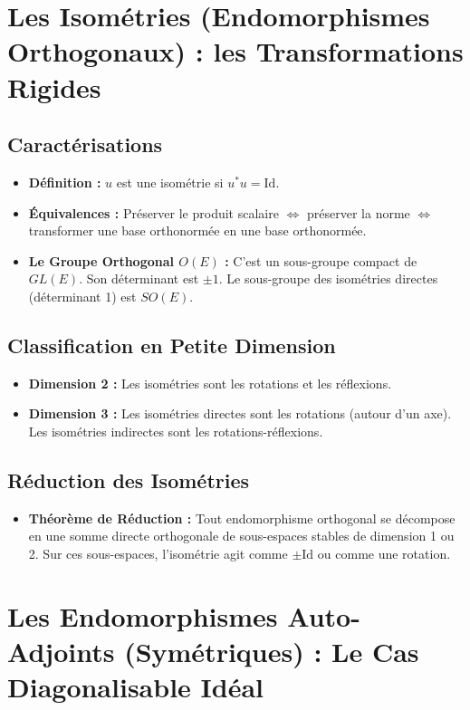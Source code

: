 \documentclass[12pt, a4paper, parskip=full]{report}
\theoremstyle{agregstyle}
\begin{document}
\section{Les Isométries (Endomorphismes Orthogonaux) : les Transformations Rigides}
\subsection{Caractérisations}
\begin{itemize}
    \item \textbf{Définition :} $u$ est une isométrie si $u^*u = \mathrm{Id}$.
    \item \textbf{Équivalences :} Préserver le produit scalaire $\iff$ préserver la norme $\iff$ transformer une base orthonormée en une base orthonormée.
    \item \textbf{Le Groupe Orthogonal $O(E)$ :} C'est un sous-groupe compact de $GL(E)$. Son déterminant est $\pm 1$. Le sous-groupe des isométries directes (déterminant 1) est $SO(E)$.
\end{itemize}
\subsection{Classification en Petite Dimension}
\begin{itemize}
    \item \textbf{Dimension 2 :} Les isométries sont les rotations et les réflexions.
    \item \textbf{Dimension 3 :} Les isométries directes sont les rotations (autour d'un axe). Les isométries indirectes sont les rotations-réflexions.
\end{itemize}
\subsection{Réduction des Isométries}
\begin{itemize}
    \item \textbf{Théorème de Réduction :} Tout endomorphisme orthogonal se décompose en une somme directe orthogonale de sous-espaces stables de dimension 1 ou 2. Sur ces sous-espaces, l'isométrie agit comme $\pm \mathrm{Id}$ ou comme une rotation.
\end{itemize}

\section{Les Endomorphismes Auto-Adjoints (Symétriques) : Le Cas Diagonalisable Idéal}
\end{document}
